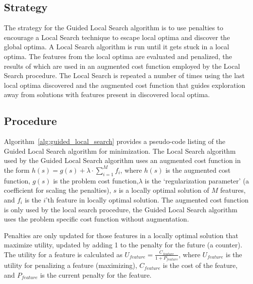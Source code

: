 \subsection{Strategy}
The strategy for the Guided Local Search algorithm is to use penalties to encourage a Local Search technique to escape local optima and discover the global optima.
A Local Search algorithm is run until it gets stuck in a local optima. The features from the local optima are evaluated and penalized, the results of which are used in an augmented cost function employed by the Local Search procedure. The Local Search is repeated a number of times using the last local optima discovered and the augmented cost function that guides exploration away from solutions with features present in  discovered local optima.

\subsection{Procedure}
Algorithm~\ref{alg:guided_local_search} provides a pseudo-code listing of the Guided Local Search algorithm for minimization. 
The Local Search algorithm used by the Guided Local Search algorithm uses an augmented cost function in the form  $h(s)=g(s)+\lambda\cdot\sum_{i=1}^{M}f_i$, where 
$h(s)$ is the augmented cost function, $g(s)$ is the problem cost function,$\lambda$ is the `regularization parameter' (a coefficient for scaling the penalties), $s$ is a locally optimal solution of $M$ features, and $f_i$ is the $i$'th feature in locally optimal solution. The augmented cost function is only used by the local search procedure, the Guided Local Search algorithm uses the problem specific cost function without augmentation.

Penalties are only updated for those features in a locally optimal solution that maximize utility, updated by adding 1 to the penalty for the future (a counter). 
The utility for a feature is calculated as $U_{feature}=\frac{C_{feature}}{1+P_{feature}}$, where $U_{feature}$ is the utility for penalizing a feature (maximizing), $C_{feature}$ is the cost of the feature, and $P_{feature}$ is the current penalty for the feature.

